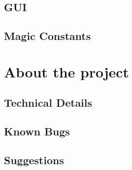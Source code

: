 \documentclass[final,nopreprintline]{elsarticle}
\begin{document}
\subsection{GUI}
\label{subsec:gui}
    

\subsection{Magic Constants}
\label{subsec:consts}
    


\section{About the project}
\label{sec:about}

\subsection{Technical Details}
\label{subsec:technical}
    

\subsection{Known Bugs}
\label{subsec:bugs}
    

\subsection{Suggestions}
\label{subsec:suggest}
    


 


%
\end{document}
